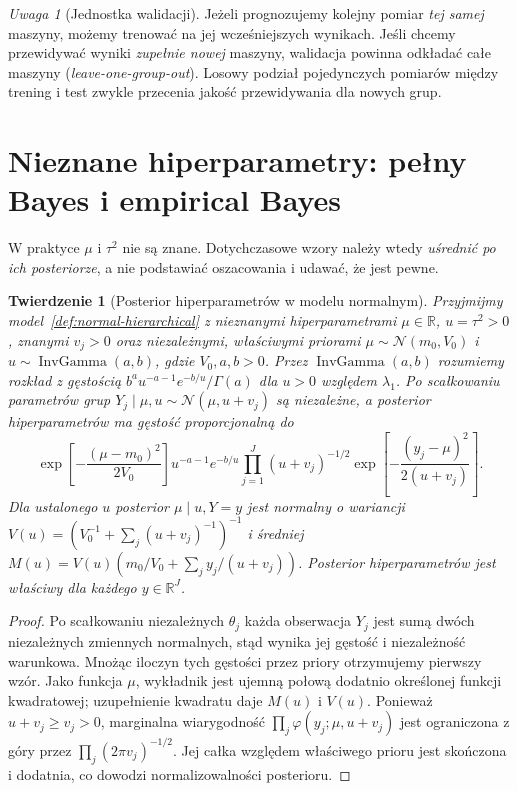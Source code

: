 \documentclass[11pt,a4paper,oneside]{report}
\numberwithin{equation}{chapter}
\theoremstyle{plain}
\newtheorem{twierdzenie}{Twierdzenie}[chapter]
\theoremstyle{definition}
\theoremstyle{remark}
\newtheorem{uwaga}{Uwaga}[chapter]
\newcommand{\R}{\mathbb R}
\newcommand{\Normal}{\mathcal N}
\begin{document}
\begin{uwaga}[Jednostka walidacji]
Jeżeli prognozujemy kolejny pomiar \emph{tej samej} maszyny,
możemy trenować na jej wcześniejszych wynikach. Jeśli chcemy
przewidywać wyniki \emph{zupełnie nowej} maszyny, walidacja
powinna odkładać całe maszyny (\emph{leave-one-group-out}).
Losowy podział pojedynczych pomiarów między trening i test
zwykle przecenia jakość przewidywania dla nowych grup.
\end{uwaga}

\section{Nieznane hiperparametry: pełny Bayes i empirical Bayes}
W praktyce $\mu$ i $\tau^2$ nie są znane. Dotychczasowe
wzory należy wtedy \emph{uśrednić po ich posteriorze},
a nie podstawiać oszacowania i udawać, że jest pewne.

\begin{twierdzenie}[Posterior hiperparametrów w modelu normalnym]
\label{thm:normal-hyperposterior}
Przyjmijmy model~\ref{def:normal-hierarchical} z nieznanymi
hiperparametrami $\mu\in\R$, $u=\tau^2>0$, znanymi
$v_j>0$ oraz niezależnymi, właściwymi priorami
$\mu\sim\Normal(m_0,V_0)$ i
$u\sim\operatorname{InvGamma}(a,b)$, gdzie $V_0,a,b>0$.
Przez $\operatorname{InvGamma}(a,b)$ rozumiemy rozkład
z gęstością $b^a u^{-a-1}e^{-b/u}/\Gamma(a)$ dla $u>0$
względem $\lambda_1$. Po scałkowaniu parametrów grup
$Y_j\mid\mu,u\sim\Normal(\mu,u+v_j)$ są niezależne,
a posterior hiperparametrów ma gęstość proporcjonalną do
\[
 \exp\!\left[-\frac{(\mu-m_0)^2}{2V_0}\right]
 u^{-a-1}e^{-b/u}\prod_{j=1}^J(u+v_j)^{-1/2}
 \exp\!\left[-\frac{(y_j-\mu)^2}{2(u+v_j)}\right].
\]
Dla ustalonego $u$ posterior $\mu\mid u,Y=y$ jest normalny
o wariancji $V(u)=(V_0^{-1}+\sum_j(u+v_j)^{-1})^{-1}$
i średniej
$M(u)=V(u)(m_0/V_0+\sum_jy_j/(u+v_j))$.
Posterior hiperparametrów jest właściwy dla każdego $y\in\R^J$.
\end{twierdzenie}
\begin{proof}
Po scałkowaniu niezależnych $\theta_j$ każda obserwacja
$Y_j$ jest sumą dwóch niezależnych zmiennych normalnych,
stąd wynika jej gęstość i niezależność warunkowa.
Mnożąc iloczyn tych gęstości przez priory otrzymujemy
pierwszy wzór. Jako funkcja $\mu$, wykładnik jest
ujemną połową dodatnio określonej funkcji kwadratowej;
uzupełnienie kwadratu daje $M(u)$ i $V(u)$.
Ponieważ $u+v_j\ge v_j>0$, marginalna wiarygodność
$\prod_j\varphi(y_j;\mu,u+v_j)$ jest ograniczona
z góry przez $\prod_j(2\pi v_j)^{-1/2}$.
Jej całka względem właściwego prioru jest skończona
i dodatnia, co dowodzi normalizowalności posterioru.
\end{proof}
\end{document}
